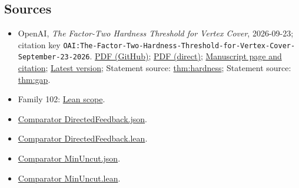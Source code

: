 \documentclass[11pt]{article}
\begin{document}
\subsection{Sources}
\begin{itemize}
\item OpenAI, \emph{The Factor-Two Hardness Threshold for Vertex Cover}, 2026-09-23; citation key \texttt{OAI:The-Factor-Two-Hardness-Threshold-for-Vertex-Cover-September-23-2026}. \href{https://github.com/openai/math/blob/adc7f1241b42e322a6451854ab7e4b4c146bf78a/preprints/The-Factor-Two-Hardness-Threshold-for-Vertex-Cover-September-23-2026/paper.pdf}{PDF (GitHub)}; \href{https://github.com/openai/math/raw/adc7f1241b42e322a6451854ab7e4b4c146bf78a/preprints/The-Factor-Two-Hardness-Threshold-for-Vertex-Cover-September-23-2026/paper.pdf}{PDF (direct)}; \href{https://github.com/openai/math/blob/adc7f1241b42e322a6451854ab7e4b4c146bf78a/preprints/The-Factor-Two-Hardness-Threshold-for-Vertex-Cover-September-23-2026/README.md}{Manuscript page and citation}; \href{https://github.com/openai/math/blob/main/preprints/The-Factor-Two-Hardness-Threshold-for-Vertex-Cover-September-23-2026/paper.pdf}{Latest version}; Statement source: \href{https://github.com/openai/math/blob/adc7f1241b42e322a6451854ab7e4b4c146bf78a/preprints/The-Factor-Two-Hardness-Threshold-for-Vertex-Cover-September-23-2026/build/sections/introduction.tex\#L33}{thm:hardness}; Statement source: \href{https://github.com/openai/math/blob/adc7f1241b42e322a6451854ab7e4b4c146bf78a/preprints/The-Factor-Two-Hardness-Threshold-for-Vertex-Cover-September-23-2026/build/sections/introduction.tex\#L15}{thm:gap}.
\item Family 102: \href{https://github.com/openai/math/blob/adc7f1241b42e322a6451854ab7e4b4c146bf78a/lean/docs/102.md}{Lean scope}.
\item \href{https://github.com/openai/math/blob/adc7f1241b42e322a6451854ab7e4b4c146bf78a/lean/ComparatorChallenges/DirectedFeedback.json}{Comparator DirectedFeedback.json}.
\item \href{https://github.com/openai/math/blob/adc7f1241b42e322a6451854ab7e4b4c146bf78a/lean/ComparatorChallenges/DirectedFeedback.lean}{Comparator DirectedFeedback.lean}.
\item \href{https://github.com/openai/math/blob/adc7f1241b42e322a6451854ab7e4b4c146bf78a/lean/ComparatorChallenges/MinUncut.json}{Comparator MinUncut.json}.
\item \href{https://github.com/openai/math/blob/adc7f1241b42e322a6451854ab7e4b4c146bf78a/lean/ComparatorChallenges/MinUncut.lean}{Comparator MinUncut.lean}.

\end{itemize}
\end{document}
